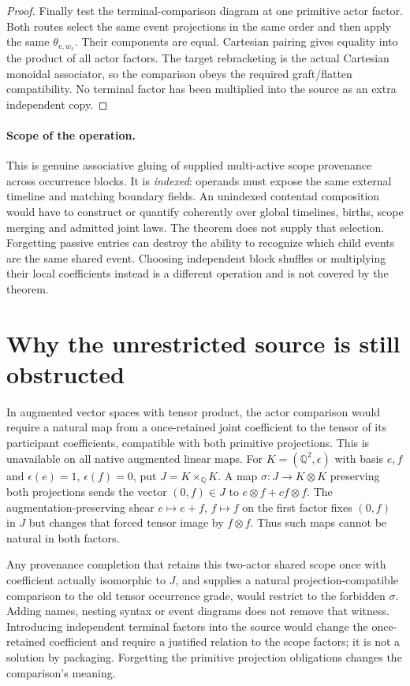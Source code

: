 \documentclass[11pt]{article}
\begin{document}
\begin{proof}
Finally test the terminal-comparison diagram at one primitive actor factor. Both routes select the same event projections in the same order and then apply the same $\theta_{v,w_v}$. Their components are equal. Cartesian pairing gives equality into the product of all actor factors. The target rebracketing is the actual Cartesian monoidal associator, so the comparison obeys the required graft/flatten compatibility. No terminal factor has been multiplied into the source as an extra independent copy.
\end{proof}

\paragraph{Scope of the operation.} This is genuine associative gluing of supplied multi-active scope provenance across occurrence blocks. It is \emph{indexed}: operands must expose the same external timeline and matching boundary fields. An unindexed contentad composition would have to construct or quantify coherently over global timelines, births, scope merging and admitted joint laws. The theorem does not supply that selection. Forgetting passive entries can destroy the ability to recognize which child events are the same shared event. Choosing independent block shuffles or multiplying their local coefficients instead is a different operation and is not covered by the theorem.

\section{Why the unrestricted source is still obstructed}
In augmented vector spaces with tensor product, the actor comparison would require a natural map from a once-retained joint coefficient to the tensor of its participant coefficients, compatible with both primitive projections. This is unavailable on all native augmented linear maps. For $K=(\mathbb Q^2,\epsilon)$ with basis $e,f$ and $\epsilon(e)=1$, $\epsilon(f)=0$, put $J=K\times_{\mathbb Q}K$. A map $\sigma:J\to K\otimes K$ preserving both projections sends the vector $(0,f)\in J$ to $e\otimes f+c f\otimes f$. The augmentation-preserving shear $e\mapsto e+f$, $f\mapsto f$ on the first factor fixes $(0,f)$ in $J$ but changes that forced tensor image by $f\otimes f$. Thus such maps cannot be natural in both factors.

Any provenance completion that retains this two-actor shared scope once with coefficient actually isomorphic to $J$, and supplies a natural projection-compatible comparison to the old tensor occurrence grade, would restrict to the forbidden $\sigma$. Adding names, nesting syntax or event diagrams does not remove that witness. Introducing independent terminal factors into the source would change the once-retained coefficient and require a justified relation to the scope factors; it is not a solution by packaging. Forgetting the primitive projection obligations changes the comparison's meaning.
\end{document}
